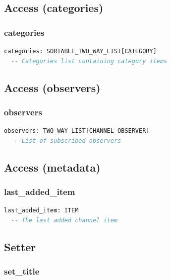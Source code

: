 \subsection{Access (categories)}
\label{sec:channel-access-categories}

\subsubsection{categories}

\begin{lstlisting}[language=Eiffel]
categories: SORTABLE_TWO_WAY_LIST[CATEGORY]
  -- Categories list containing category items
\end{lstlisting}

\subsection{Access (observers)}
\label{sec:channel-access-observer}

\subsubsection{observers}

\begin{lstlisting}[language=Eiffel]
observers: TWO_WAY_LIST[CHANNEL_OBSERVER]
  -- List of subscribed observers
\end{lstlisting}


\subsection{Access (metadata)}
\label{sec:channel-access-metadata}

\subsubsection{last\_added\_item}

\begin{lstlisting}[language=Eiffel]
last_added_item: ITEM
  -- The last added channel item
\end{lstlisting}

\subsection{Setter}
\label{sec:channel-setter}

\subsubsection{set\_title}

